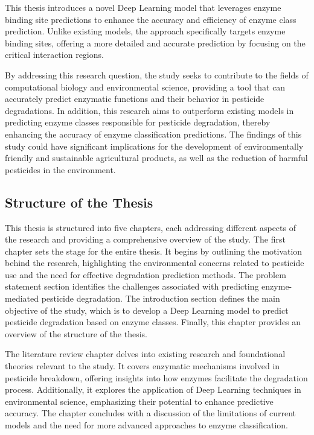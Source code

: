 This thesis introduces a novel Deep Learning model that leverages enzyme binding site predictions to enhance the accuracy and efficiency of enzyme class prediction. Unlike existing models, the approach specifically targets enzyme binding sites, offering a more detailed and accurate prediction by focusing on the critical interaction regions.

By addressing this research question, the study seeks to contribute to the fields of computational biology and environmental science, providing a tool that can accurately predict enzymatic functions and their behavior in pesticide degradations. In addition, this research aims to outperform existing models in predicting enzyme classes responsible for pesticide degradation, thereby enhancing the accuracy of enzyme classification predictions. The findings of this study could have significant implications for the development of environmentally friendly and sustainable agricultural products, as well as the reduction of harmful pesticides in the environment.

\subsection{Structure of the Thesis}
\label{sec:Structure of the Thesis}
This thesis is structured into five chapters, each addressing different aspects of the research and providing a comprehensive overview of the study.
The first chapter sets the stage for the entire thesis. It begins by outlining the motivation behind the research, highlighting the environmental concerns related to pesticide use and the need for effective degradation prediction methods. The problem statement section identifies the challenges associated with predicting enzyme-mediated pesticide degradation. The introduction section defines the main objective of the study, which is to develop a Deep Learning model to predict pesticide degradation based on enzyme classes. Finally, this chapter provides an overview of the structure of the thesis.

The literature review chapter delves into existing research and foundational theories relevant to the study. It covers enzymatic mechanisms involved in pesticide breakdown, offering insights into how enzymes facilitate the degradation process. Additionally, it explores the application of Deep Learning techniques in environmental science, emphasizing their potential to enhance predictive accuracy. The chapter concludes with a discussion of the limitations of current models and the need for more advanced approaches to enzyme classification.

